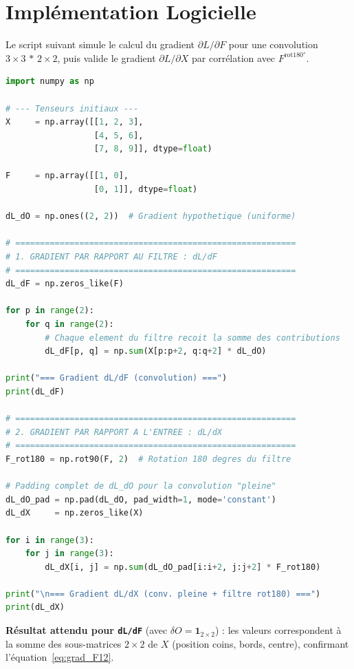 \documentclass[12pt, a4paper]{article}
\begin{document}
\section{Implémentation Logicielle}

Le script suivant simule le calcul du gradient $\partial L / \partial F$
pour une convolution $3 \times 3 \,*\, 2 \times 2$, puis valide le gradient
$\partial L / \partial X$ par corrélation avec $F^{\text{rot180°}}$.

\begin{lstlisting}[language=Python, caption={Calcul des gradients convolutifs -- NumPy}, label=lst:conv]
import numpy as np

# --- Tenseurs initiaux ---
X     = np.array([[1, 2, 3],
                  [4, 5, 6],
                  [7, 8, 9]], dtype=float)

F     = np.array([[1, 0],
                  [0, 1]], dtype=float)

dL_dO = np.ones((2, 2))  # Gradient hypothetique (uniforme)

# =========================================================
# 1. GRADIENT PAR RAPPORT AU FILTRE : dL/dF
# =========================================================
dL_dF = np.zeros_like(F)

for p in range(2):
    for q in range(2):
        # Chaque element du filtre recoit la somme des contributions
        dL_dF[p, q] = np.sum(X[p:p+2, q:q+2] * dL_dO)

print("=== Gradient dL/dF (convolution) ===")
print(dL_dF)

# =========================================================
# 2. GRADIENT PAR RAPPORT A L'ENTREE : dL/dX
# =========================================================
F_rot180 = np.rot90(F, 2)  # Rotation 180 degres du filtre

# Padding complet de dL_dO pour la convolution "pleine"
dL_dO_pad = np.pad(dL_dO, pad_width=1, mode='constant')
dL_dX     = np.zeros_like(X)

for i in range(3):
    for j in range(3):
        dL_dX[i, j] = np.sum(dL_dO_pad[i:i+2, j:j+2] * F_rot180)

print("\n=== Gradient dL/dX (conv. pleine + filtre rot180) ===")
print(dL_dX)
\end{lstlisting}

\begin{resultbox}
\textbf{Résultat attendu pour \texttt{dL/dF}} (avec $\delta O = \mathbf{1}_{2\times2}$) :
les valeurs correspondent à la somme des sous-matrices $2\times2$ de $X$
(position coins, bords, centre), confirmant l'équation~\eqref{eq:grad_F12}.
\end{resultbox}
\end{document}
